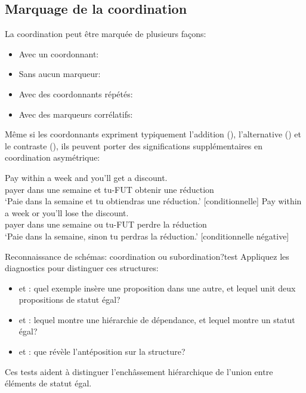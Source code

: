 \subsection{Marquage de la coordination}

La coordination peut être marquée de plusieurs façons:
\begin{itemize}[noitemsep]
    \item Avec un coordonnant: 
    \item Sans aucun marqueur: 
    \item Avec des coordonnants répétés: 
    \item Avec des marqueurs corrélatifs: 
\end{itemize}

Même si les coordonnants expriment typiquement l'addition (), l'alternative () et le contraste (), ils peuvent porter des significations supplémentaires en coordination asymétrique:

\ea \label{ex:coord-meaning-fr}
    \ea \gll Pay within a week and you'll get a discount.\\
        payer dans une semaine et tu-FUT obtenir une réduction\\
    \glt `Paie dans la semaine et tu obtiendras une réduction.' [conditionnelle]
    \ex \gll Pay within a week or you'll lose the discount.\\
        payer dans une semaine ou tu-FUT perdre la réduction\\
    \glt `Paie dans la semaine, sinon tu perdras la réduction.' [conditionnelle négative]
    \z
\z

\begin{tblsframedsymbol}{Reconnaissance de schémas: coordination ou subordination?}{test}
Appliquez les diagnostics pour distinguer ces structures:
\begin{itemize}[noitemsep, leftmargin=*]
    \item {} et : quel exemple insère une proposition dans une autre, et lequel unit deux propositions de statut égal?
    \item {} et : lequel montre une hiérarchie de dépendance, et lequel montre un statut égal?
    \item {} et : que révèle l'antéposition sur la structure?
\end{itemize}
Ces tests aident à distinguer l'enchâssement hiérarchique de l'union entre éléments de statut égal.
\end{tblsframedsymbol}

